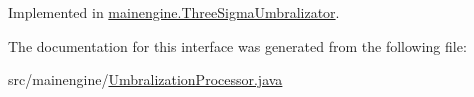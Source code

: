 Implemented in \hyperlink{classmainengine_1_1_three_sigma_umbralizator_a56bfd8fcc856b38e503273e85c0ccf33}{mainengine.\+Three\+Sigma\+Umbralizator}.



The documentation for this interface was generated from the following file\+:\begin{DoxyCompactItemize}
\item 
src/mainengine/\hyperlink{_umbralization_processor_8java}{Umbralization\+Processor.\+java}\end{DoxyCompactItemize}
